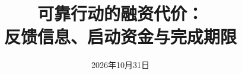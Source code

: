 \documentclass[UTF8,fontset=windows,11pt,a4paper]{ctexart}
\begin{document}
\title{可靠行动的融资代价：\\反馈信息、启动资金与完成期限}
\author{}\date{2026年10月31日}
\maketitle

\clearpage\appendix
{}

\end{document}
